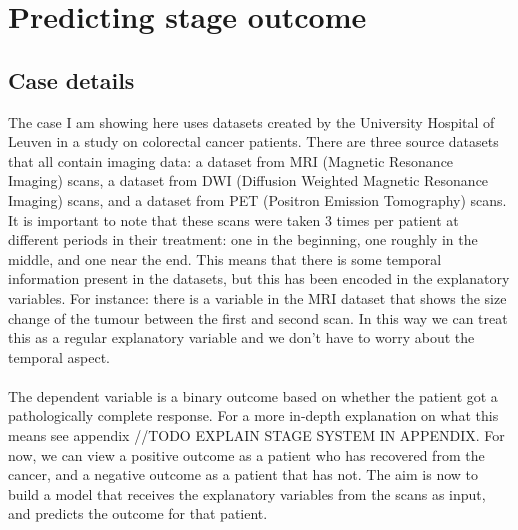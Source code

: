 \section{Predicting stage outcome}
\label{sec:evaluation-predictingstage}
\subsection{Case details}
\label{sec:evaluation-casedetails}
The case I am showing here uses datasets created by the University Hospital of Leuven in a study on colorectal cancer patients. There are three source datasets that all contain imaging data: a dataset from MRI (Magnetic Resonance Imaging) scans, a dataset from DWI (Diffusion Weighted Magnetic Resonance Imaging) scans, and a dataset from PET (Positron Emission Tomography) scans. It is important to note that these scans were taken 3 times per patient at different periods in their treatment: one in the beginning, one roughly in the middle, and one near the end. This means that there is some temporal information present in the datasets, but this has been encoded in the explanatory variables. For instance: there is a variable in the MRI dataset that shows the size change of the tumour between the first and second scan. In this way we can treat this as a regular explanatory variable and we don't have to worry about the temporal aspect. \\ \\
The dependent variable is a binary outcome based on whether the patient got a pathologically complete response. For a more in-depth explanation on what this means see appendix //TODO EXPLAIN STAGE SYSTEM IN APPENDIX. For now, we can view a positive outcome as a patient who has recovered from the cancer, and a negative outcome as a patient that has not. The aim is now to build a model that receives the explanatory variables from the scans as input, and predicts the outcome for that patient.
